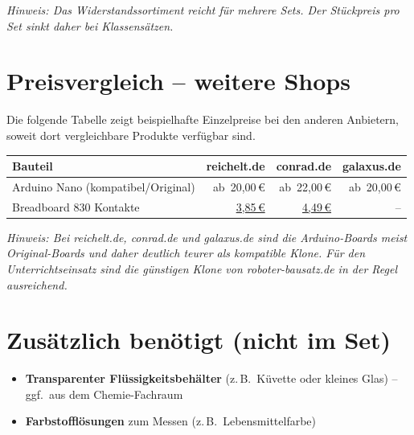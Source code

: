 \documentclass[a4paper,12pt]{article}
\begin{document}
\smallskip\noindent
\textit{Hinweis: Das Widerstandssortiment reicht für mehrere Sets.
Der Stückpreis pro Set sinkt daher bei Klassensätzen.}

\newpage
\section{Preisvergleich -- weitere Shops}

Die folgende Tabelle zeigt beispielhafte Einzelpreise bei den anderen
Anbietern, soweit dort vergleichbare Produkte verfügbar sind.

\begin{table}[h!]
\centering
\renewcommand{\arraystretch}{1.35}
\begin{tabular}{@{} l r r r @{}}
\toprule
\textbf{Bauteil}
  & \textbf{reichelt.de}
  & \textbf{conrad.de}
  & \textbf{galaxus.de} \\
\midrule

Arduino Nano (kompatibel/Original)
  & ab~20,00\,\euro{}
  & ab~22,00\,\euro{}
  & ab~20,00\,\euro{} \\



Breadboard 830 Kontakte
  & \href{https://www.reichelt.de/de/de/shop/produkt/experimentier-steckboard_830_kontakte-282600}{3,85\,\euro{}}
  & \href{https://www.conrad.de/de/p/joy-it-breadboard-830-steckplatine-polzahl-gesamt-830-l-x-b-165-mm-x-55-mm-1-st-2253827.html}{4,49\,\euro{}}
  & -- \\

\bottomrule
\end{tabular}

\label{tab:vergleich}
\end{table}

\smallskip\noindent
\textit{Hinweis: Bei reichelt.de, conrad.de und galaxus.de sind die Arduino-Boards
meist Original-Boards und daher deutlich teurer als kompatible Klone.
Für den Unterrichtseinsatz sind die günstigen Klone von roboter-bausatz.de
in der Regel ausreichend.}

\section{Zusätzlich benötigt (nicht im Set)}

\begin{itemize}
  \item \textbf{Transparenter Flüssigkeitsbehälter} (z.\,B.\ Küvette oder kleines Glas)
    -- ggf.\ aus dem Chemie-Fachraum
  \item \textbf{Farbstofflösungen} zum Messen (z.\,B.\ Lebensmittelfarbe)
\end{itemize}
\end{document}
